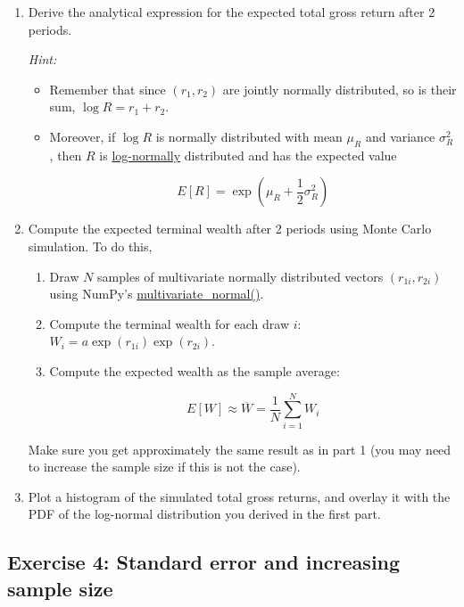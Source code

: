 \documentclass[10pt]{scrartcl}
\begin{document}
\begin{enumerate}
\def\labelenumi{\arabic{enumi}.}
\item
  Derive the analytical expression for the expected total gross return
  after 2 periods.

  \emph{Hint:}

  \begin{itemize}
  \item
    Remember that since \((r_1,r_2)\) are jointly normally distributed,
    so is their sum, \(\log R = r_1 + r_2\).
  \item
    Moreover, if \(\log R\) is normally distributed with mean \(\mu_R\)
    and variance \(\sigma_R^2\), then \(R\) is
    \href{https://en.wikipedia.org/wiki/Log-normal_distribution}{log-normally}
    distributed and has the expected value

    \[E[R] = \exp\left(\mu_R + \frac{1}{2}\sigma_R^2 \right)\]
  \end{itemize}
\item
  Compute the expected terminal wealth after 2 periods using Monte Carlo
  simulation. To do this,

  \begin{enumerate}
  \def\labelenumii{\arabic{enumii}.}
  \item
    Draw \(N\) samples of multivariate normally distributed vectors
    \((r_{1i},r_{2i})\) using NumPy's
    \href{https://numpy.org/doc/stable/reference/random/generated/numpy.random.multivariate_normal.html}{multivariate\_normal()}.
  \item
    Compute the terminal wealth for each draw \(i\):
    \(W_i = a\exp(r_{1i})\exp(r_{2i})\).
  \item
    Compute the expected wealth as the sample average:

    \[E[W] \approx \overline{W} = \frac{1}{N}\sum_{i=1}^N W_i\]
  \end{enumerate}

  Make sure you get approximately the same result as in part 1 (you may
  need to increase the sample size if this is not the case).
\item
  Plot a histogram of the simulated total gross returns, and overlay it
  with the PDF of the log-normal distribution you derived in the first
  part.
\end{enumerate}

    \hypertarget{exercise-4-standard-error-and-increasing-sample-size}{%
\subsection{Exercise 4: Standard error and increasing sample
size}\label{exercise-4-standard-error-and-increasing-sample-size}}
\end{document}
